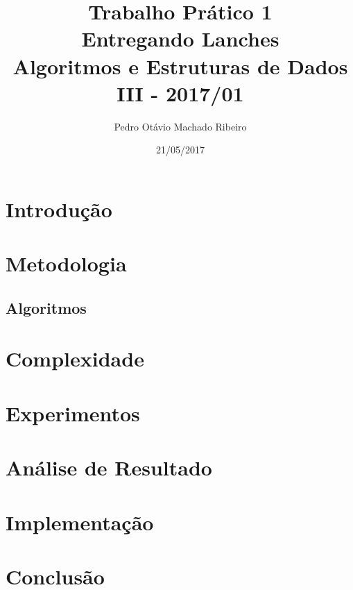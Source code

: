 \documentclass[
	12pt,
	a4paper,
	twoside,
	brazil
]{article}
\author{Pedro Otávio Machado Ribeiro}
\title{Trabalho Prático 1\\Entregando Lanches\\Algoritmos e Estruturas de Dados III - 2017/01}
\date{21/05/2017}
\begin{document}
	\maketitle
	
	\section{Introdução}
	
	\section{Metodologia}
	
		\subsection{Algoritmos}
		
	\section{Complexidade}
	
	\section{Experimentos}
	
	\section{Análise de Resultado}
	
	\section{Implementação}
	
	\section{Conclusão}
\end{document}

